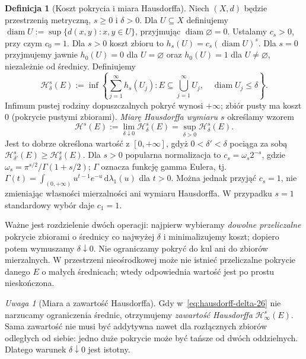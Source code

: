 \documentclass[11pt,a4paper,oneside]{book}
\numberwithin{equation}{chapter}
\theoremstyle{plain}
\theoremstyle{definition}
\newtheorem{definicja}[twierdzenie]{Definicja}
\theoremstyle{remark}
\newtheorem{uwaga}[twierdzenie]{Uwaga}
\begin{document}
\begin{definicja}[Koszt pokrycia i miara Hausdorffa]
\label{def:hausdorff-measure-26}
Niech $(X,d)$ będzie przestrzenią metryczną, $s\geq0$
i $\delta>0$. Dla $U\subseteq X$ definiujemy
$\operatorname{diam}U:=\sup\{d(x,y):x,y\in U\}$,
przyjmując $\operatorname{diam}\varnothing=0$.
Ustalamy $c_s>0$, przy czym $c_0=1$.
Dla $s>0$ koszt zbioru to $h_s(U)=c_s(\operatorname{diam}U)^s$.
Dla $s=0$ przyjmujemy jawnie
$h_0(U)=0$ dla $U=\varnothing$ oraz $h_0(U)=1$
dla $U\neq\varnothing$, niezależnie od średnicy.
Definiujemy
\begin{equation}\label{eq:hausdorff-delta-26}
 \mathcal H^s_\delta(E)
 :=\inf\left\{\sum_{j=1}^\infty h_s(U_j):
 E\subseteq\bigcup_{j=1}^\infty U_j,\quad
 \operatorname{diam}U_j\leq\delta\right\}.
\end{equation}
Infimum pustej rodziny dopuszczalnych pokryć wynosi
$+\infty$; zbiór pusty ma koszt $0$ (pokrycie pustymi
zbiorami). \emph{Miarę Hausdorffa wymiaru $s$} określamy
wzorem
\begin{equation}\label{eq:hausdorff-26}
 \mathcal H^s(E):=\lim_{\delta\downarrow0}
 \mathcal H^s_\delta(E)
 =\sup_{\delta>0}\mathcal H^s_\delta(E).
\end{equation}
Jest to dobrze określona wartość z $[0,+\infty]$,
gdyż $0<\delta'<\delta$ pociąga za sobą
$\mathcal H^s_{\delta'}(E)\geq\mathcal H^s_\delta(E)$.
Dla $s>0$ popularna normalizacja to
$c_s=\omega_s2^{-s}$, gdzie
$\omega_s=\pi^{s/2}/\Gamma(1+s/2)$;
$\Gamma$ oznacza funkcję gamma Eulera, tj.
$\Gamma(t)=\int_{(0,+\infty)}u^{t-1}e^{-u}\,\mathrm d\lambda_1(u)$
dla $t>0$. Można jednak przyjąć $c_s=1$, nie zmieniając
własności mierzalności ani wymiaru Hausdorffa.
W przypadku $s=1$ standardowy wybór daje $c_1=1$.
\end{definicja}

Ważne jest rozdzielenie dwóch operacji: najpierw
wybieramy \emph{dowolne przeliczalne} pokrycie zbiorami
o średnicy co najwyżej $\delta$ i minimalizujemy koszt;
dopiero potem wymuszamy $\delta\downarrow0$.
Nie ograniczamy pokryć do kul ani do zbiorów mierzalnych.
W przestrzeni nieośrodkowej może nie istnieć przeliczalne
pokrycie danego $E$ o małych średnicach; wtedy
odpowiednia wartość jest po prostu nieskończona.

\begin{uwaga}[Miara a zawartość Hausdorffa]
Gdy w~\eqref{eq:hausdorff-delta-26} nie narzucamy
ograniczenia średnic, otrzymujemy \emph{zawartość
Hausdorffa} $\mathcal H^s_\infty(E)$. Sama zawartość
nie musi być addytywna nawet dla rozłącznych
zbiorów odległych od siebie: jedno duże pokrycie
może być tańsze od dwóch oddzielnych.
Dlatego warunek $\delta\downarrow0$ jest istotny.
\end{uwaga}
\end{document}
